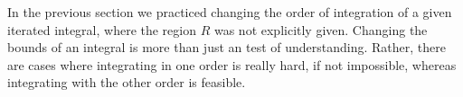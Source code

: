 %

In the previous section we practiced changing the order of integration of a given iterated integral, where the region $R$ was not explicitly given. Changing the bounds of an integral is more than just an test of understanding. Rather, there are cases where integrating in one order is really hard, if not impossible, whereas integrating with the other order is feasible.

